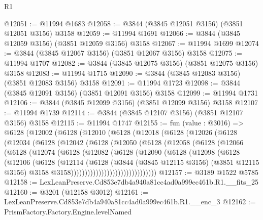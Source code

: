 \begin{lexlean}{R1}
\begin{coremodule}
@12051 := @11994 @1683
@12058 := @3844 (@3845 @12051 @3156) (@3851 @12051 @3156) @3158
@12059 := @11994 @1691
@12066 := @3844 (@3845 @12059 @3156) (@3851 @12059 @3156) @3158
@12067 := @11994 @1699
@12074 := @3844 (@3845 @12067 @3156) (@3851 @12067 @3156) @3158
@12075 := @11994 @1707
@12082 := @3844 (@3845 @12075 @3156) (@3851 @12075 @3156) @3158
@12083 := @11994 @1715
@12090 := @3844 (@3845 @12083 @3156) (@3851 @12083 @3156) @3158
@12091 := @11994 @1723
@12098 := @3844 (@3845 @12091 @3156) (@3851 @12091 @3156) @3158
@12099 := @11994 @1731
@12106 := @3844 (@3845 @12099 @3156) (@3851 @12099 @3156) @3158
@12107 := @11994 @1739
@12114 := @3844 (@3845 @12107 @3156) (@3851 @12107 @3156) @3158
@12115 := @11994 @1747
@12155 := fun (value : @3016) =>
  @6128
    (@12002
      (@6128
        (@12010
          (@6128
            (@12018
              (@6128
                (@12026
                  (@6128
                    (@12034
                      (@6128
                        (@12042
                          (@6128
                            (@12050
                              (@6128
                                (@12058
                                  (@6128
                                    (@12066
                                      (@6128
                                        (@12074
                                          (@6128
                                            (@12082
                                              (@6128
                                                (@12090
                                                  (@6128
                                                    (@12098
                                                      (@6128
                                                        (@12106
                                                          (@6128
                                                            (@12114
                                                              (@6128
                                                                (@3844
                                                                  (@3845 @12115 @3156)
                                                                  (@3851 @12115 @3156)
                                                                  @3158
                                                                  @3158)))))))))))))))))))))))))))))))
@12157 := @3189 @1522 @5785
@12158 := LexLeanPreserve.Cd853e7db4a940a81cc4ad0a999ec461b.R1.__fits_25
@12160 := @3201 (@12158 @3012)
@12161 := LexLeanPreserve.Cd853e7db4a940a81cc4ad0a999ec461b.R1.__enc_3
@12162 := PrismFactory.Factory.Engine.levelNamed

\end{coremodule}
\end{lexlean}
